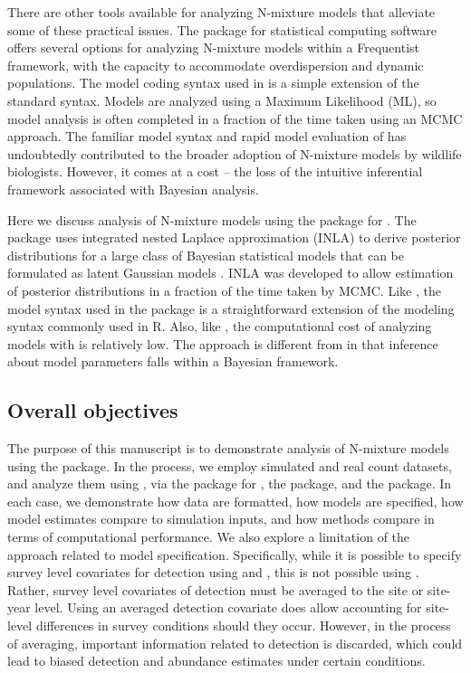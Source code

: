 \documentclass[article]{jss}
\begin{document}
There are other tools available for analyzing N-mixture models that alleviate some of these practical issues.  The  package \citep{Fiske_Chandler_others_2011} for  statistical computing software \citep{R_Core_Team_2016} offers several options for analyzing N-mixture models within a Frequentist framework, with the capacity to accommodate overdispersion and dynamic populations.  The model coding syntax used in  is a simple extension of the standard  syntax.  Models are analyzed using a Maximum Likelihood (ML), so model analysis is often completed in a fraction of the time taken using an MCMC approach.  The familiar model syntax and rapid model evaluation of  has undoubtedly contributed to the broader adoption of N-mixture models by wildlife biologists.  However, it comes at a cost -- the loss of the intuitive inferential framework associated with Bayesian analysis.

Here we discuss analysis of N-mixture models using the  package \citep{Rue_Martino_Lindgren_Simpson_Riebler_2013} for .  The  package uses integrated nested Laplace approximation (INLA) to derive posterior distributions for a large class of Bayesian statistical models that can be formulated as latent Gaussian models \citep{Rue_Martino_Chopin_2009}. INLA was developed to allow estimation of posterior distributions in a fraction of the time taken by MCMC.  Like , the model syntax used in the  package is a straightforward extension of the modeling syntax commonly used in R.  Also, like , the computational cost of analyzing models with  is relatively low.  The  approach is different from  in that inference about model parameters falls within a Bayesian framework.

\subsection[Overall objectives]{Overall objectives}
The purpose of this manuscript is to demonstrate analysis of N-mixture models using the  package. In the process, we employ simulated and real count datasets, and analyze them using , via the  package \citep{Denwood_2016} for , the  package, and the  package. In each case, we demonstrate how data are formatted, how models are specified, how model estimates compare to simulation inputs, and how methods compare in terms of computational performance. We also explore a limitation of the  approach related to model specification.  Specifically, while it is possible to specify survey level covariates for detection using  and , this is not possible using .  Rather, survey level covariates of detection must be averaged to the site or site-year level.  Using an averaged detection covariate does allow accounting for site-level differences in survey conditions should they occur.  However, in the process of averaging, important information related to detection is discarded, which could lead to biased detection and abundance estimates under certain conditions.
\end{document}
